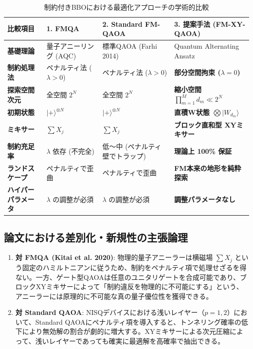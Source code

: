 \documentclass[11pt,a4paper]{ltjsarticle}
\theoremstyle{definition}
\theoremstyle{plain}
\theoremstyle{remark}
\newcommand{\ket}[1]{|#1\rangle}
\begin{document}
\begin{table}[htbp]
\centering
\small
\caption{制約付きBBOにおける最適化アプローチの学術的比較}
\label{tab:comprehensive_comparison}
\begin{tabularx}{\textwidth}{@{}lXXX@{}}
\toprule
\textbf{比較項目} & \textbf{1. FMQA \cite{kitai2020designing}} & \textbf{2. Standard FM-QAOA \cite{farhi2014quantum}} & \textbf{3. 提案手法 (FM-XY-QAOA)} \\ \midrule
\textbf{基礎理論} & 量子アニーリング (AQC) & 標準QAOA (Farhi 2014) & Quantum Alternating Ansatz \cite{hadfield2019from} \\
\textbf{制約処理法} & ペナルティ法 ($\lambda > 0$) & ペナルティ法 ($\lambda > 0$) & \textbf{部分空間拘束 ($\lambda = 0$)} \\
\textbf{探索空間次元} & 全空間 $2^N$ & 全空間 $2^N$ & \textbf{縮小空間 $\prod_{m=1}^M d_m \ll 2^N$} \\
\textbf{初期状態} & $\ket{+}^{\otimes N}$ & $\ket{+}^{\otimes N}$ & \textbf{直積W状態 $\bigotimes \ket{W_{d_m}}$} \\
\textbf{ミキサー} & $\sum X_j$ & $\sum X_j$ & \textbf{ブロック直和型 XYミキサー} \\
\textbf{制約充足率} & $\lambda$ 依存 (不完全) & 低〜中 (ペナルティ壁でトラップ) & \textbf{理論上 100\% 保証} \\
\textbf{ランドスケープ} & ペナルティで歪曲 & ペナルティで歪曲 & \textbf{FM本来の地形を純粋探索} \\
\textbf{ハイパーパラメータ} & $\lambda$ の調整が必須 & $\lambda$ の調整が必須 & \textbf{調整パラメータなし} \\ \bottomrule
\end{tabularx}
\end{table}

\subsection{論文における差別化・新規性の主張論理}
\begin{enumerate}
    \item \textbf{対 FMQA (Kitai et al. 2020)}: 
    物理的量子アニーラーは横磁場 $\sum X_j$ という固定のハミルトニアンに従うため、制約をペナルティ項で処理せざるを得ない。一方、ゲート型QAOAは任意のユニタリゲートを合成可能であり、ブロックXYミキサーによって「制約違反を物理的に不可能にする」という、アニーラーには原理的に不可能な真の量子優位性を獲得できる。
    \item \textbf{対 Standard QAOA}:
    NISQデバイスにおける浅いレイヤー（$p=1, 2$）において、Standard QAOAにペナルティ項を導入すると、トンネリング確率の低下により無効解の割合が劇的に増大する。XYミキサーによる次元圧縮によって、浅いレイヤーであっても確実に最適解を高確率で抽出できる。
\end{enumerate}
\end{document}
